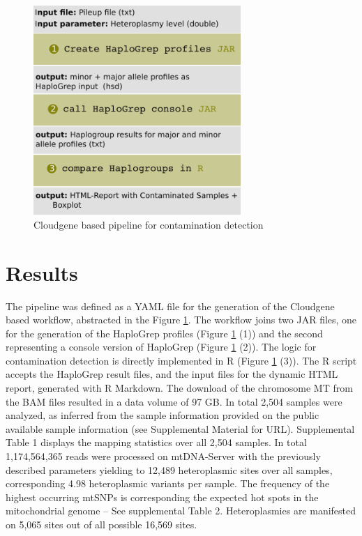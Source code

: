 \begin{figure}[!ht]
    \centering
    \includegraphics[width=0.7\textwidth]{images/workflow_haplochecker.png}
    \caption[Cloudgene pipeline for contamination detection]{Cloudgene based pipeline for contamination detection } 
    \label{cont:workflow}
\end{figure}

 
\section{Results}\label{cont:result}
The pipeline was defined as a YAML file for the generation of the Cloudgene based workflow, abstracted in the Figure \ref{cont:workflow}. The workflow joins two JAR files, one for the generation of the HaploGrep profiles (Figure \ref{cont:workflow} (1)) and the second representing a console version of HaploGrep (Figure \ref{cont:workflow} (2)). The logic for contamination detection is directly implemented in R (Figure \ref{cont:workflow} (3)). The R script accepts the HaploGrep result files, and the input files for the dynamic HTML report, generated with R Markdown. 
The download of the chromosome MT from the BAM files resulted in a data volume of 97 GB. In total 2,504 samples were analyzed, as inferred from the sample information provided on the public available sample information (see Supplemental Material for URL). Supplemental Table 1 displays the mapping statistics over all 2,504 samples. In total 1,174,564,365 reads were processed on mtDNA-Server with the previously described parameters yielding to 12,489 heteroplasmic sites over all samples, corresponding 4.98 heteroplasmic variants per sample. The frequency of the highest occurring mtSNPs is corresponding the expected hot spots in the mitochondrial genome – See supplemental Table 2. Heteroplasmies are manifested on 5,065 sites out of all possible 16,569 sites. 

